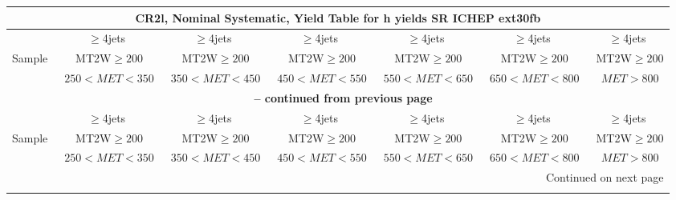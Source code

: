 \documentclass{article}
\begin{document}
\begin{longtable}{|l|c|c|c|c|c|c|} 
 
\multicolumn{7}{c}{ CR2l, Nominal Systematic, Yield Table for h yields SR ICHEP ext30fb }\\* \hline 
  & $\ge$4jets  & $\ge$4jets  & $\ge$4jets  & $\ge$4jets  & $\ge$4jets  & $\ge$4jets \\* 
Sample  & ~MT2W$\ge200$  & ~MT2W$\ge200$  & ~MT2W$\ge200$  & ~MT2W$\ge200$  & ~MT2W$\ge200$  & ~MT2W$\ge200$ \\* 
  & ~$250<MET<350$  & ~$350<MET<450$  & ~$450<MET<550$  & ~$550<MET<650$  & ~$650<MET<800$  & ~$MET>800$ \\* 
\hline \hline 
\endfirsthead 
 
\multicolumn{7}{c}{{\bfseries \tablename\ \thetable{} -- continued from previous page}}\\* \hline 
  & $\ge$4jets  & $\ge$4jets  & $\ge$4jets  & $\ge$4jets  & $\ge$4jets  & $\ge$4jets \\* 
Sample  & ~MT2W$\ge200$  & ~MT2W$\ge200$  & ~MT2W$\ge200$  & ~MT2W$\ge200$  & ~MT2W$\ge200$  & ~MT2W$\ge200$ \\* 
  & ~$250<MET<350$  & ~$350<MET<450$  & ~$450<MET<550$  & ~$550<MET<650$  & ~$650<MET<800$  & ~$MET>800$ \\* 
\hline \hline 
\endhead 
 
\multicolumn{7}{|r|}{{Continued on next page}}\\* \hline 
\endfoot 
 
 
\endlastfoot 
 

\end{longtable}
\end{document}
